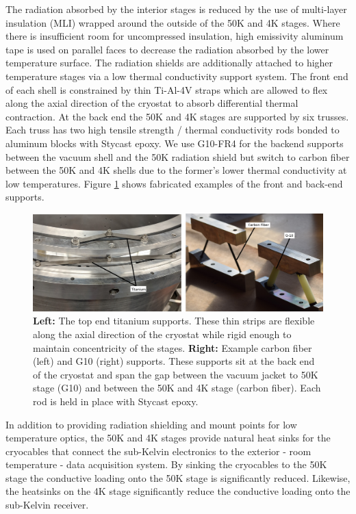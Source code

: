 \documentclass[]{spie}  %
\begin{document}
The radiation absorbed by the interior stages is reduced by the use of
multi-layer insulation (MLI) wrapped around the outside of the 50K and 4K stages. Where
there is insufficient room for uncompressed insulation, high emissivity
aluminum tape is used on parallel faces to decrease the radiation absorbed by the lower
temperature surface. The radiation shields are additionally attached to higher temperature stages
via a low thermal conductivity support system. The front end of each shell is
constrained by thin Ti-Al-4V straps which are allowed to flex along the axial
direction of the cryostat to absorb differential thermal contraction. At the
back end the 50K and 4K stages are supported by six trusses. Each truss has two high
tensile strength / thermal conductivity rods bonded to aluminum blocks with
Stycast epoxy. We use G10-FR4 for the backend supports between the vacuum
shell and the 50K radiation shield but switch to carbon fiber between the 50K
and 4K shells due to the former's lower thermal conductivity at low
temperatures. Figure \ref{fig:supports} shows fabricated examples of the
front and back-end supports.

\begin{figure}[t]
	\center
	\includegraphics[scale=0.1]{supports.png}
	\caption{\textbf{Left:} The top end titanium supports. These thin strips
	are flexible along the axial direction of the cryostat while rigid enough
	to maintain concentricity of the stages. \textbf{Right:} Example carbon fiber (left) and G10 (right) supports. These
	supports sit at the back end of the cryostat and span the gap between the
	vacuum jacket to 50K stage (G10) and between the 50K and 4K stage (carbon
	fiber). Each rod is held in place with Stycast epoxy.}
	\label{fig:supports}
\end{figure}



In addition to providing radiation shielding and mount points for low
temperature optics, the 50K and 4K stages provide natural heat sinks for the
cryocables that connect the sub-Kelvin electronics to the exterior - room
temperature - data acquisition system. By sinking the cryocables to the 50K
stage the conductive loading onto the 50K stage is significantly reduced.
Likewise, the heatsinks on the 4K stage significantly reduce the conductive
loading onto the sub-Kelvin receiver. 
\end{document}
